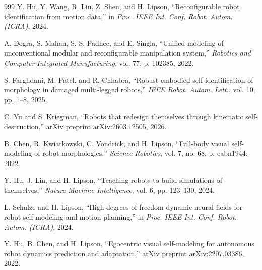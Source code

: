 \documentclass[11pt,a4paper]{article}
\begin{document}
\begin{thebibliography}{999}
Y. Hu, Y. Wang, R. Liu, Z. Shen, and H. Lipson, ``Reconfigurable robot identification from motion data,'' in \textit{Proc. IEEE Int. Conf. Robot. Autom. (ICRA)}, 2024.




A. Dogra, S. Mahan, S. S. Padhee, and E. Singla, ``Unified modeling of unconventional modular and reconfigurable manipulation system,'' \textit{Robotics and Computer-Integrated Manufacturing}, vol. 77, p. 102385, 2022.




S. Farghdani, M. Patel, and R. Chhabra, ``Robust embodied self-identification of morphology in damaged multi-legged robots,'' \textit{IEEE Robot. Autom. Lett.}, vol. 10, pp. 1--8, 2025.




C. Yu and S. Kriegman, ``Robots that redesign themselves through kinematic self-destruction,'' arXiv preprint arXiv:2603.12505, 2026.





B. Chen, R. Kwiatkowski, C. Vondrick, and H. Lipson, ``Full-body visual self-modeling of robot morphologies,'' \textit{Science Robotics}, vol. 7, no. 68, p. eabn1944, 2022.




Y. Hu, J. Lin, and H. Lipson, ``Teaching robots to build simulations of themselves,'' \textit{Nature Machine Intelligence}, vol. 6, pp. 123--130, 2024.




L. Schulze and H. Lipson, ``High-degrees-of-freedom dynamic neural fields for robot self-modeling and motion planning,'' in \textit{Proc. IEEE Int. Conf. Robot. Autom. (ICRA)}, 2024.




Y. Hu, B. Chen, and H. Lipson, ``Egocentric visual self-modeling for autonomous robot dynamics prediction and adaptation,'' arXiv preprint arXiv:2207.03386, 2022.





\end{thebibliography}
\end{document}
